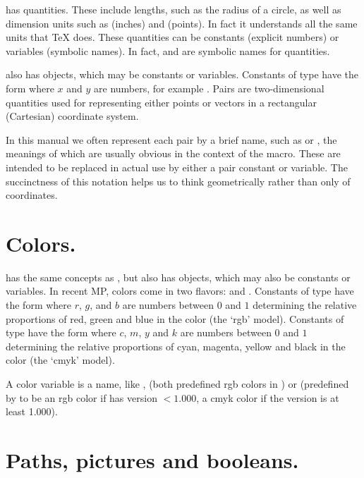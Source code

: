 \documentclass[letterpaper]{article}
\begin{document}
\CMF{} has  quantities. These include lengths, such as the
radius of a circle, as well as dimension units such as  (inches)
and  (points). In fact it understands all the same units that
\TeX{} does. These  quantities can be constants (explicit
numbers) or variables (symbolic names). In fact,  and 
are symbolic names for  quantities.

\CMF{} also has  objects, which may be constants or variables.
Constants of type  have the form  where $x$ and
$y$ are numbers, for example .  Pairs are two-dimensional
quantities used for representing either points or vectors in a
rectangular (Cartesian) coordinate system.

In this manual we often represent each pair by a brief name, such as
 or , the meanings of which are usually obvious in the
context of the macro. These are intended to be replaced in actual use by
either a pair constant or variable. The succinctness of this notation
helps us to think geometrically rather than only of coordinates.


\section{Colors.}\label{MPcolors}

\CMP{} has the same concepts as \MF, but also has  objects,
which may also be constants or variables. In recent MP{}, colors come in
two flavors:  and . Constants of type
 have the form  where $r$, $g$, and $b$
are numbers between $0$ and $1$ determining the relative proportions of
red, green and blue in the color (the `rgb' model). Constants of type
 have the form  where $c$, $m$, $y$
and $k$ are numbers between $0$ and $1$ determining the relative
proportions of cyan, magenta, yellow and black in the color (the `cmyk'
model).

A color variable is a name, like ,  (both predefined
rgb colors in \MP) or  (predefined by \mfp{} to be an rgb
color if \MP{} has version ${}<1.000$, a cmyk color if the version is at
least 1.000).


\section{Paths, pictures and booleans.}\label{paths}
\end{document}
